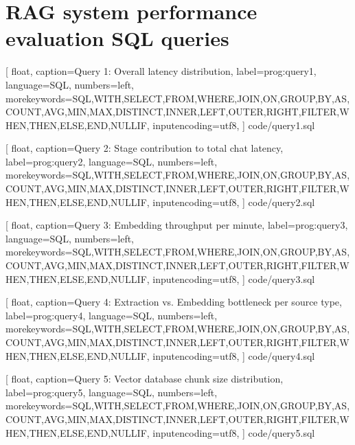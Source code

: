 %
%
%

\chapter{RAG system performance evaluation SQL queries}
\label{app:performance-queries}
\renewcommand{\lstlistingname}{Code snippet}


    [
        float,
        caption={Query 1: Overall latency distribution},
        label=prog:query1,
        language=SQL,
        numbers=left,
        morekeywords={SQL,WITH,SELECT,FROM,WHERE,JOIN,ON,GROUP,BY,AS,COUNT,AVG,MIN,MAX,DISTINCT,INNER,LEFT,OUTER,RIGHT,FILTER,WHEN,THEN,ELSE,END,NULLIF},
        inputencoding=utf8,
    ]
    {code/query1.sql}


    [
        float,
        caption={Query 2: Stage contribution to total chat latency},
        label=prog:query2,
        language=SQL,
        numbers=left,
        morekeywords={SQL,WITH,SELECT,FROM,WHERE,JOIN,ON,GROUP,BY,AS,COUNT,AVG,MIN,MAX,DISTINCT,INNER,LEFT,OUTER,RIGHT,FILTER,WHEN,THEN,ELSE,END,NULLIF},
        inputencoding=utf8,
    ]
    {code/query2.sql}


    [
        float,
        caption={Query 3: Embedding throughput per minute},
        label=prog:query3,
        language=SQL,
        numbers=left,
        morekeywords={SQL,WITH,SELECT,FROM,WHERE,JOIN,ON,GROUP,BY,AS,COUNT,AVG,MIN,MAX,DISTINCT,INNER,LEFT,OUTER,RIGHT,FILTER,WHEN,THEN,ELSE,END,NULLIF},
        inputencoding=utf8,
    ]
    {code/query3.sql}


    [
        float,
        caption={Query 4: Extraction vs. Embedding bottleneck per source type},
        label=prog:query4,
        language=SQL,
        numbers=left,
        morekeywords={SQL,WITH,SELECT,FROM,WHERE,JOIN,ON,GROUP,BY,AS,COUNT,AVG,MIN,MAX,DISTINCT,INNER,LEFT,OUTER,RIGHT,FILTER,WHEN,THEN,ELSE,END,NULLIF},
        inputencoding=utf8,
    ]
    {code/query4.sql}


    [
        float,
        caption={Query 5: Vector database chunk size distribution},
        label=prog:query5,
        language=SQL,
        numbers=left,
        morekeywords={SQL,WITH,SELECT,FROM,WHERE,JOIN,ON,GROUP,BY,AS,COUNT,AVG,MIN,MAX,DISTINCT,INNER,LEFT,OUTER,RIGHT,FILTER,WHEN,THEN,ELSE,END,NULLIF},
        inputencoding=utf8,
    ]
    {code/query5.sql}

